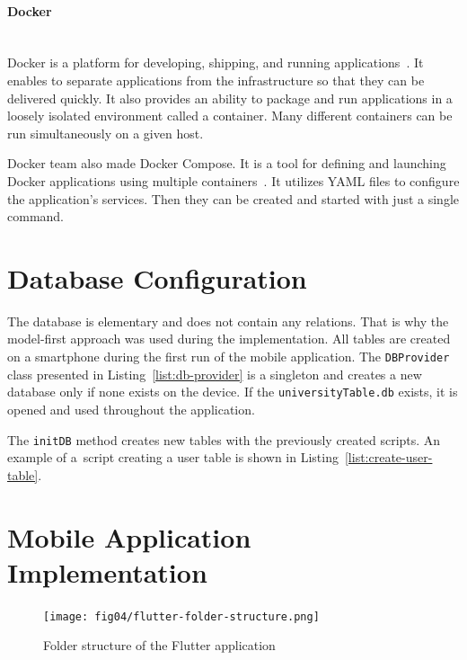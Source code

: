 \paragraph{\large{Docker}}\mbox{}\\[2pt]
Docker is a platform for developing, shipping, and running applications~\cite{docker}. It enables to separate applications from the infrastructure so that they can be delivered quickly. It also provides an ability to package and run applications in a loosely isolated environment called a container. Many different containers can be run simultaneously on a given host.

Docker team also made Docker Compose. It is a tool for defining and launching Docker applications using multiple containers~\cite{docker-compose}. It utilizes YAML files to configure the application’s services. Then they can be created and started with just a single command.

\section{Database Configuration}
The database is elementary and does not contain any relations. That is why the model-first approach was used during the implementation. All tables are created on a smartphone during the first run of the mobile application. The \texttt{DBProvider} class presented in Listing~\ref{list:db-provider} is a singleton and creates a new database only if none exists on the device. If the \texttt{universityTable.db} exists, it is opened and used throughout the application.



 The \texttt{initDB} method creates new tables with the previously created scripts. An example of a~script creating a user table is shown in Listing~\ref{list:create-user-table}.



\section{Mobile Application Implementation}
\begin{figure}[htb]
    \centering
    \texttt{[image: fig04/flutter-folder-structure.png]}
    \caption{Folder structure of the Flutter application}
    \label{fig:flutter-folder-structure}
\end{figure}

